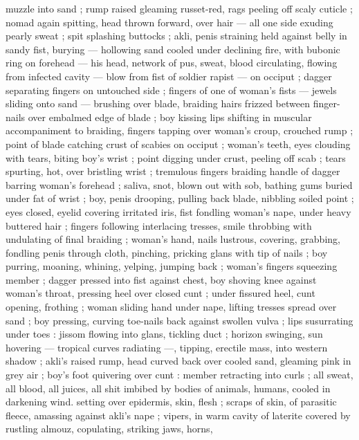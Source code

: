 muzzle into sand ; rump raised gleaming russet-red, rags peeling off 
scaly cuticle ; nomad again spitting, head thrown forward, over hair 
--- all one side exuding pearly sweat ; spit splashing buttocks ; akli, 
penis straining held against belly in sandy fist, burying --- hollowing 
sand cooled under declining fire, with bubonic ring on forehead --- 
his head, network of pus, sweat, blood circulating, flowing from 
infected cavity --- blow from fist of soldier rapist --- on occiput ; 
dagger separating fingers on untouched side ; fingers of one of 
woman's fists --- jewels sliding onto sand --- brushing over blade, 
braiding hairs frizzed between finger-nails over embalmed edge of 
blade ; boy kissing lips shifting in muscular accompaniment to 
braiding, fingers tapping over woman's croup, crouched rump ; point 
of blade catching crust of scabies on occiput ; woman's teeth, eyes 
clouding with tears, biting boy's wrist ; point digging under crust, 
peeling off scab ; tears spurting, hot, over bristling wrist ; tremulous 
fingers braiding handle of dagger barring woman's forehead ; saliva, 
snot, blown out with sob, bathing gums buried under fat of wrist ; 
boy, penis drooping, pulling back blade, nibbling soiled point ; eyes 
closed, eyelid covering irritated iris, fist fondling woman's nape, 
under heavy buttered hair ; fingers following interlacing tresses, 
smile throbbing with undulating of final braiding ; woman's hand, 
nails  lustrous, covering, grabbing, fondling penis through 
cloth, pinching, pricking glans with tip of nails ; boy purring, 
moaning, whining, yelping, jumping back ; woman's fingers 
squeezing member ; dagger pressed into fist against chest, boy 
shoving knee against woman's throat, pressing heel over closed cunt 
; under fissured heel, cunt opening, frothing ; woman sliding hand 
under nape, lifting tresses spread over sand ; boy pressing, curving 
toe-nails back against swollen vulva ; lips susurrating under toes : 
jissom flowing into glans, tickling duct ; horizon swinging, sun 
hovering --- tropical curves radiating ---, tipping, erectile mass, into 
western shadow ; akli's raised rump, head curved back over cooled 
sand, gleaming pink in grey air ; boy's foot quivering over cunt : 
member retracting into curls ; all sweat, all blood, all juices, all shit 
imbibed by bodies of animals, humans, cooled in darkening wind. 
setting over epidermis, skin, flesh ; scraps of skin, of parasitic 
fleece, amassing against akli's nape ; vipers, in warm cavity of 
laterite covered by rustling almouz, copulating, striking jaws, horns, 
